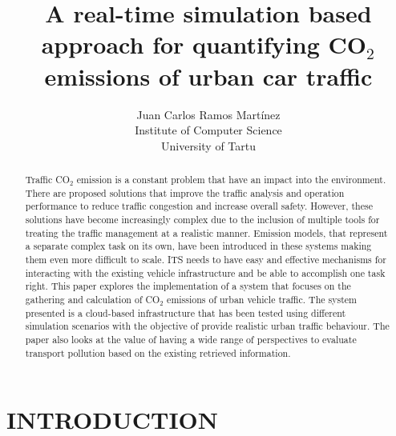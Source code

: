 \documentclass[letter, 10pt, conference]{ieeeconf}
\title{\LARGE \bf A real-time simulation based approach for quantifying CO$_2$ emissions of urban car traffic}
\author{ \parbox{4 in}{ \centering Juan Carlos Ramos Martínez \\
  Institute of Computer Science\\
  University of Tartu}}
\begin{document}
\maketitle
\thispagestyle{empty}
\pagestyle{empty}


\begin{abstract}

Traffic CO$_2$ emission is a constant problem that have an impact into the environment.
There are proposed solutions that improve the traffic analysis and operation performance to reduce traffic congestion and increase overall safety.
However, these solutions have become increasingly complex due to the inclusion of multiple tools for treating the traffic management at a realistic manner.
Emission models, that represent a separate complex task on its own, have been introduced in these systems making them even more difficult to scale.
ITS needs to have easy and effective mechanisms for interacting with the existing vehicle infrastructure and be able to accomplish one task right.
This paper explores the implementation of a system that focuses on the gathering and calculation of CO$_2$ emissions of urban vehicle traffic.
The system presented is a cloud-based infrastructure that has been tested using different simulation scenarios with the objective of provide realistic urban traffic behaviour.
The paper also looks at the value of having a wide range of perspectives to evaluate transport pollution based on the existing retrieved information.

\end{abstract}

\section{INTRODUCTION}
\end{document}
